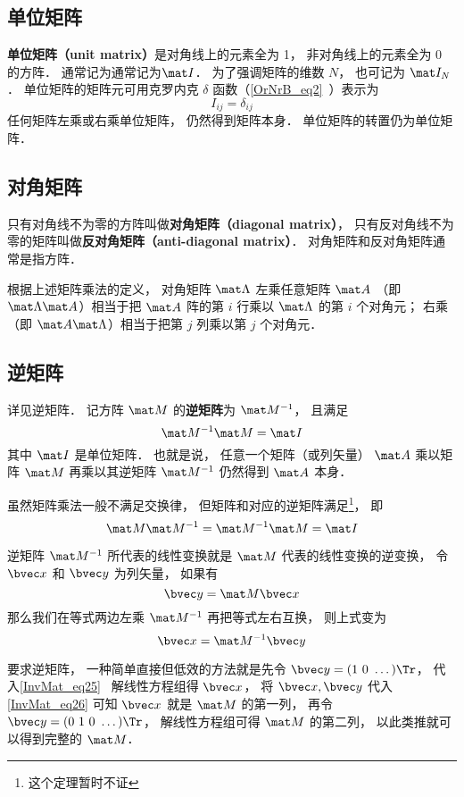 \subsection{单位矩阵}
\textbf{单位矩阵（unit matrix）}是对角线上的元素全为 1， 非对角线上的元素全为 0 的方阵． 通常记为通常记为$\mat I$． 为了强调矩阵的维数 $N$， 也可记为 $\mat I_N$． 单位矩阵的矩阵元可用克罗内克 $\delta$ 函数（\autoref{OrNrB_eq2}~）表示为
\begin{equation}
I_{ij} = \delta_{ij}
\end{equation} 
任何矩阵左乘或右乘单位矩阵， 仍然得到矩阵本身． 单位矩阵的转置仍为单位矩阵．

\subsection{对角矩阵}
只有对角线不为零的方阵叫做\textbf{对角矩阵（diagonal matrix）}， 只有反对角线不为零的矩阵叫做\textbf{反对角矩阵（anti-diagonal matrix）}． 对角矩阵和反对角矩阵通常是指方阵．

根据上述矩阵乘法的定义， 对角矩阵 $\mat\Lambda$ 左乘任意矩阵 $\mat A$ （即 $\mat\Lambda\mat A$）相当于把 $\mat A$ 阵的第 $i$ 行乘以 $\mat\Lambda$ 的第 $i$ 个对角元； 右乘（即 $\mat A\mat\Lambda$）相当于把第 $j$ 列乘以第 $j$ 个对角元．

\subsection{逆矩阵}
详见逆矩阵． 记方阵 $\mat M$ 的\textbf{逆矩阵}为 $\mat M^{-1}$， 且满足
\begin{equation}
\mat M^{-1} \mat M = \mat I
\end{equation}
其中 $\mat I$ 是单位矩阵． 也就是说， 任意一个矩阵（或列矢量） $\mat A$ 乘以矩阵 $\mat M$ 再乘以其逆矩阵 $\mat M^{-1}$ 仍然得到 $\mat A$ 本身．

虽然矩阵乘法一般不满足交换律， 但矩阵和对应的逆矩阵满足\footnote{这个定理暂时不证}， 即
\begin{equation}
\mat M\mat M^{-1} = \mat M^{-1} \mat M = \mat I
\end{equation}

逆矩阵 $\mat M^{-1}$ 所代表的线性变换就是 $\mat M$ 代表的线性变换的逆变换， 令 $\bvec x$ 和 $\bvec y$ 为列矢量， 如果有
\begin{equation}\label{Mat_eq25}
\bvec y = \mat M \bvec x
\end{equation}
那么我们在等式两边左乘 $\mat M^{-1}$ 再把等式左右互换， 则上式变为
\begin{equation}\label{Mat_eq26}
\bvec x = \mat M^{-1} \bvec y
\end{equation}

要求逆矩阵， 一种简单直接但低效的方法就是先令 $\bvec y = (1\ 0\ \dots)\Tr$， 代入\autoref{InvMat_eq25}~ 解线性方程组得 $\bvec x$， 将 $\bvec x, \bvec y$ 代入\autoref{InvMat_eq26} 可知 $\bvec x$ 就是 $\mat M$ 的第一列， 再令 $\bvec y = (0\ 1\ 0\ \dots)\Tr$， 解线性方程组可得 $\mat M$ 的第二列， 以此类推就可以得到完整的 $\mat M$．
